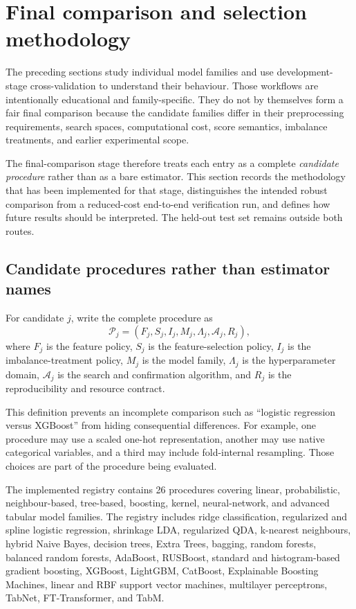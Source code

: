 \section{Final comparison and selection methodology}
\label{sec:final-comparison-methodology}

The preceding sections study individual model families and use development-stage cross-validation to understand their behaviour. Those workflows are intentionally educational and family-specific. They do not by themselves form a fair final comparison because the candidate families differ in their preprocessing requirements, search spaces, computational cost, score semantics, imbalance treatments, and earlier experimental scope.

The final-comparison stage therefore treats each entry as a complete \emph{candidate procedure} rather than as a bare estimator. This section records the methodology that has been implemented for that stage, distinguishes the intended robust comparison from a reduced-cost end-to-end verification run, and defines how future results should be interpreted. The held-out test set remains outside both routes.

\subsection{Candidate procedures rather than estimator names}

For candidate $j$, write the complete procedure as
\[
\mathcal{P}_j
=
\left(
F_j,
S_j,
I_j,
M_j,
\Lambda_j,
\mathcal{A}_j,
R_j
\right),
\]
where $F_j$ is the feature policy, $S_j$ is the feature-selection policy, $I_j$ is the imbalance-treatment policy, $M_j$ is the model family, $\Lambda_j$ is the hyperparameter domain, $\mathcal{A}_j$ is the search and confirmation algorithm, and $R_j$ is the reproducibility and resource contract.

This definition prevents an incomplete comparison such as ``logistic regression versus XGBoost'' from hiding consequential differences. For example, one procedure may use a scaled one-hot representation, another may use native categorical variables, and a third may include fold-internal resampling. Those choices are part of the procedure being evaluated.

The implemented registry contains 26 procedures covering linear, probabilistic, neighbour-based, tree-based, boosting, kernel, neural-network, and advanced tabular model families. The registry includes ridge classification, regularized and spline logistic regression, shrinkage LDA, regularized QDA, k-nearest neighbours, hybrid Naive Bayes, decision trees, Extra Trees, bagging, random forests, balanced random forests, AdaBoost, RUSBoost, standard and histogram-based gradient boosting, XGBoost, LightGBM, CatBoost, Explainable Boosting Machines, linear and RBF support vector machines, multilayer perceptrons, TabNet, FT-Transformer, and TabM.

